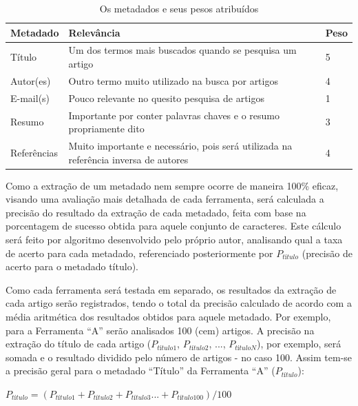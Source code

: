\begin{table}
    \caption{Os metadados e seus pesos atribuídos}
    \begin{center}
        \begin{tabular}{|p{3cm}|p{8cm}|C{1cm}|}
            \hline \textbf{Metadado} & \textbf{Relevância} & \textbf{Peso} \\ 
            \hline Título & Um dos termos mais buscados quando se pesquisa um artigo & 5 \\
            \hline Autor(es) & Outro termo muito utilizado na busca por artigos & 4 \\
            \hline E-mail(s) & Pouco relevante no quesito pesquisa de artigos & 1 \\
            \hline Resumo & Importante por conter palavras chaves e o resumo propriamente dito & 3 \\
            \hline Referências & Muito importante e necessário, pois será utilizada na referência inversa de autores & 4 \\
            \hline 
        \end{tabular} 
    \end{center}
    \label{tab:metadata-weight}
\end{table}

Como a extração de um metadado nem sempre ocorre de maneira 100\% eficaz, visando uma avaliação mais detalhada de cada ferramenta, será calculada a precisão do resultado da extração de cada metadado, feita com base na porcentagem de sucesso obtida para aquele conjunto de caracteres. Este cálculo será feito por algoritmo desenvolvido pelo próprio autor, analisando qual a taxa de acerto para cada metadado, referenciado posteriormente por $P_{título}$ (precisão de acerto para o metadado título).


Como cada ferramenta será testada em separado, os resultados da extração de cada artigo serão registrados, tendo o total da precisão calculado de acordo com a média aritmética dos resultados obtidos para aquele metadado. Por exemplo, para a Ferramenta ``A'' serão analisados 100 (cem) artigos. A precisão na extração do título de cada artigo ($P_{título1}$, $P_{título2}$, ..., $P_{títuloN}$), por exemplo, será somada e o resultado dividido pelo número de artigos - no caso 100. Assim tem-se a precisão geral para o metadado ``Título'' da Ferramenta ``A'' ($P_{título}$):

\begin{center}
    \begin{math}
        P_{título} = (P_{título1} + P_{título2} + P_{título3} ... + P_{título100}) / 100
        \label{math:result-by-metadata}
    \end{math}
\end{center}

